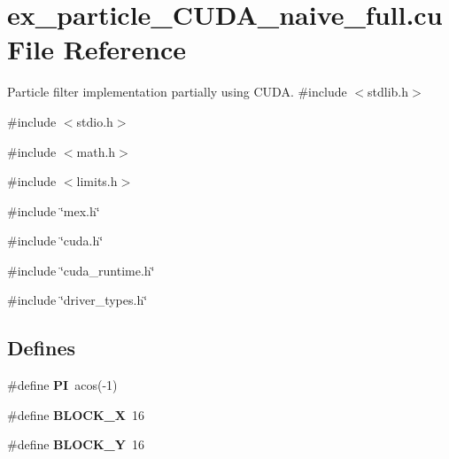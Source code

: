 \hypertarget{ex__particle__CUDA__naive__full_8cu}{
\section{ex\_\-particle\_\-CUDA\_\-naive\_\-full.cu File Reference}
\label{ex__particle__CUDA__naive__full_8cu}
}


Particle filter implementation partially using CUDA.  
{\ttfamily \#include $<$stdlib.h$>$}\par
{\ttfamily \#include $<$stdio.h$>$}\par
{\ttfamily \#include $<$math.h$>$}\par
{\ttfamily \#include $<$limits.h$>$}\par
{\ttfamily \#include \char`\"{}mex.h\char`\"{}}\par
{\ttfamily \#include \char`\"{}cuda.h\char`\"{}}\par
{\ttfamily \#include \char`\"{}cuda\_\-runtime.h\char`\"{}}\par
{\ttfamily \#include \char`\"{}driver\_\-types.h\char`\"{}}\par
\subsection*{Defines}
\begin{DoxyCompactItemize}
\item 
\hypertarget{ex__particle__CUDA__naive__full_8cu_a598a3330b3c21701223ee0ca14316eca}{
\#define {\bfseries PI}~acos(-\/1)}
\label{ex__particle__CUDA__naive__full_8cu_a598a3330b3c21701223ee0ca14316eca}

\item 
\hypertarget{ex__particle__CUDA__naive__full_8cu_a165bd291e719c4542ebcb897b0fa5481}{
\#define {\bfseries BLOCK\_\-X}~16}
\label{ex__particle__CUDA__naive__full_8cu_a165bd291e719c4542ebcb897b0fa5481}

\item 
\hypertarget{ex__particle__CUDA__naive__full_8cu_a9e261e89727a3aafdc4d8732f5b3389f}{
\#define {\bfseries BLOCK\_\-Y}~16}
\label{ex__particle__CUDA__naive__full_8cu_a9e261e89727a3aafdc4d8732f5b3389f}

\end{DoxyCompactItemize}

